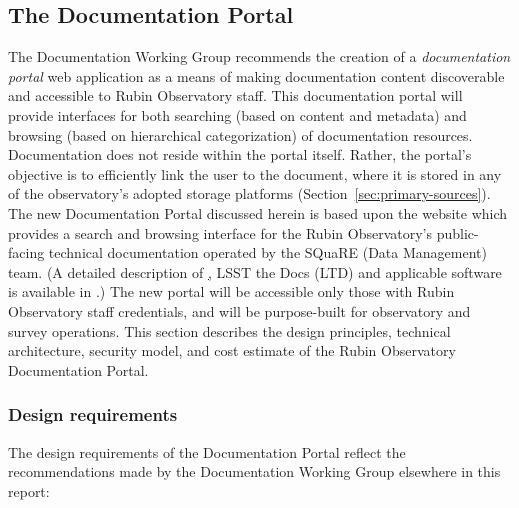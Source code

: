 \subsection{The Documentation Portal}
\label{sec:DocPortal}

The Documentation Working Group recommends the creation of a \emph{documentation portal} web application as a means of making documentation content discoverable and accessible to Rubin Observatory staff.
This documentation portal will provide interfaces for both searching (based on content and metadata) and browsing (based on hierarchical categorization) of documentation resources.
Documentation does not reside within the portal itself.
Rather, the portal's objective is to efficiently link the user to the document, where it is stored in any of the observatory's adopted storage platforms (Section~\ref{sec:primary-sources}).
The new Documentation Portal discussed herein is based upon the website \href{www.lsst.io} \citep{lsst.io-cite} which provides a search and browsing interface for the Rubin Observatory's public-facing technical documentation operated by the SQuaRE (Data Management) team.
(A detailed description of \href{www.lsst.io}, LSST the Docs (LTD) and applicable software is available in .)
The new portal will be accessible only those with Rubin Observatory staff credentials, and will be purpose-built for observatory and survey operations.
This section describes the design principles, technical architecture, security model, and cost estimate of the Rubin Observatory Documentation Portal.

\subsubsection{Design requirements}

The design requirements of the Documentation Portal reflect the recommendations made by the Documentation Working Group elsewhere in this report:

